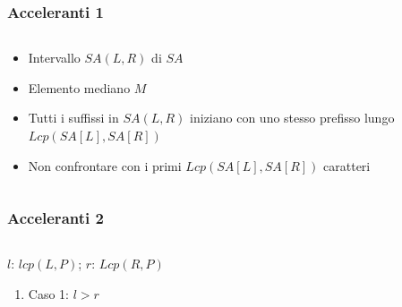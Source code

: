 \begin{frame}[fragile]
\frametitle{Acceleranti 1}
\begin{columns}
\begin{column}{0.5\textwidth}
\begin{itemize}
\item
Intervallo $SA(L, R)$ di $SA$
\item
Elemento mediano $M$
\item
Tutti i suffissi in $SA(L,R)$ iniziano con uno stesso prefisso lungo $Lcp(SA[L],
SA[R])$
\item
Non confrontare con i primi $Lcp(SA[L], SA[R])$ caratteri
\end{itemize}
\end{column}
\begin{column}{0.4\textwidth}
\begin{center}
\end{center}
\end{column}
\end{columns}
\end{frame}

\begin{frame}[fragile]
\frametitle{Acceleranti 2}
\begin{columns}[T]
\begin{column}[T]{0.6\textwidth}
\begin{block}{$l$: $lcp(L,P)$; $r$: $Lcp(R,P)$}
\begin{enumerate}
\item
Caso 1: $l>r$
\end{enumerate}
\end{block}
\end{column}
\begin{column}{0.38\textwidth}
\end{column}
\end{columns}
\end{frame}

